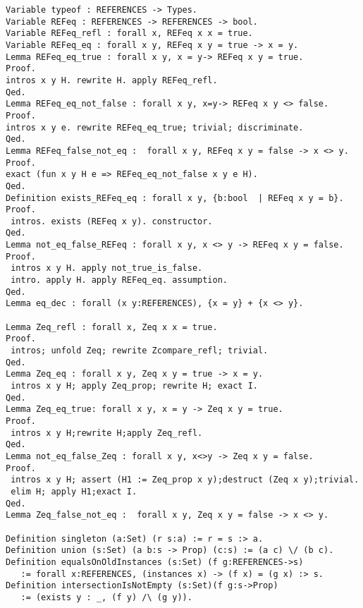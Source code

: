 \begin{verbatim}
Variable typeof : REFERENCES -> Types.
Variable REFeq : REFERENCES -> REFERENCES -> bool.
Variable REFeq_refl : forall x, REFeq x x = true. 
Variable REFeq_eq : forall x y, REFeq x y = true -> x = y. 
Lemma REFeq_eq_true : forall x y, x = y-> REFeq x y = true.
Proof.
intros x y H. rewrite H. apply REFeq_refl.
Qed. 
Lemma REFeq_eq_not_false : forall x y, x=y-> REFeq x y <> false.
Proof.
intros x y e. rewrite REFeq_eq_true; trivial; discriminate.
Qed. 
Lemma REFeq_false_not_eq :  forall x y, REFeq x y = false -> x <> y.
Proof.
exact (fun x y H e => REFeq_eq_not_false x y e H).
Qed. 
Definition exists_REFeq_eq : forall x y, {b:bool  | REFeq x y = b}.
Proof.
 intros. exists (REFeq x y). constructor.
Qed. 
Lemma not_eq_false_REFeq : forall x y, x <> y -> REFeq x y = false.
Proof.
 intros x y H. apply not_true_is_false.
 intro. apply H. apply REFeq_eq. assumption.
Qed. 
Lemma eq_dec : forall (x y:REFERENCES), {x = y} + {x <> y}.

Lemma Zeq_refl : forall x, Zeq x x = true.
Proof.
 intros; unfold Zeq; rewrite Zcompare_refl; trivial.
Qed.
Lemma Zeq_eq : forall x y, Zeq x y = true -> x = y.
 intros x y H; apply Zeq_prop; rewrite H; exact I.
Qed.
Lemma Zeq_eq_true: forall x y, x = y -> Zeq x y = true.
Proof.
 intros x y H;rewrite H;apply Zeq_refl.
Qed.
Lemma not_eq_false_Zeq : forall x y, x<>y -> Zeq x y = false.
Proof.
 intros x y H; assert (H1 := Zeq_prop x y);destruct (Zeq x y);trivial.
 elim H; apply H1;exact I.
Qed.
Lemma Zeq_false_not_eq :  forall x y, Zeq x y = false -> x <> y.

Definition singleton (a:Set) (r s:a) := r = s :> a.
Definition union (s:Set) (a b:s -> Prop) (c:s) := (a c) \/ (b c).
Definition equalsOnOldInstances (s:Set) (f g:REFERENCES->s) 
   := forall x:REFERENCES, (instances x) -> (f x) = (g x) :> s.
Definition intersectionIsNotEmpty (s:Set)(f g:s->Prop)
   := (exists y : _, (f y) /\ (g y)).
\end{verbatim}
